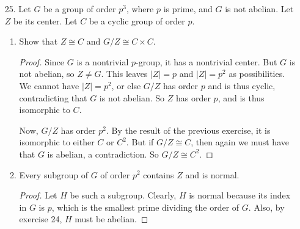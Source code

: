 \documentclass[10pt]{article}
\newcommand{\Z}{\mathbb{Z}}
\newcommand{\gen}[1]{\langle #1 \rangle}
\begin{document}
\begin{enumerate}
\begin{proof}


\end{proof}

\pagebreak
\item[25.] Let $G$ be a group of order $p^3$, where $p$ is prime, and $G$ is not abelian.  Let $Z$ be its center.  Let $C$ be a cyclic group of order $p$.
\begin{enumerate}
\item Show that $Z \cong C$ and $G/Z \cong C \times C$.
\begin{proof}
Since $G$ is a nontrivial $p$-group, it has a nontrivial center.  But $G$ is not abelian, so $Z \neq G$.  This leaves $|Z| = p$ and $|Z| = p^2$ as possibilities.  We cannot have $|Z| = p^2$, or else $G/Z$ has order $p$ and is thus cyclic, contradicting that $G$ is not abelian.  So $Z$ has order $p$, and is thus isomorphic to $C$.

Now, $G / Z$ has order $p^2$.  By the result of the previous exercise, it is isomorphic to either $C$ or $C^2$.  But if $G/Z \cong C$, then again we must have that $G$ is abelian, a contradiction.  So $G/Z \cong C^2$.
\end{proof}
\item Every subgroup of $G$ of order $p^2$ contains $Z$ and is normal.
\begin{proof}
Let $H$ be such a subgroup.  Clearly, $H$ is normal because its index in $G$ is $p$, which is the smallest prime dividing the order of $G$.  Also, by exercise 24, $H$ must be abelian.


\end{proof}
\end{enumerate}
\end{enumerate}
\end{document}
